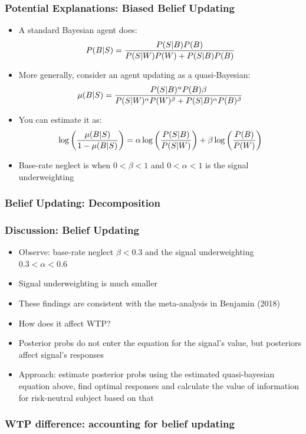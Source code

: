 \documentclass[11pt,hyperref={bookmarks=false}]{beamer}
\begin{document}
\begin{frame}
\frametitle{Potential Explanations: Biased Belief Updating}
\begin{itemize}
\item A standard Bayesian agent does:
$$P(B|S)={P(S|B)P(B)\over P(S|W)P(W)+P(S|B)P(B)}$$
\item More generally, consider an agent updating as a quasi-Bayesian:
$$\mu(B|S)={P(S|B)^{\alpha}P(B){\beta}\over P(S|W)^{\alpha} P(W)^{\beta}+P(S|B)^{\alpha}P(B)^{\beta}} $$
\item You can estimate it as:
$$\log\left({\mu(B|S) \over 1-\mu(B|S)}\right)=\alpha \log\left({P(S|B) \over P(S|W)}\right)+\beta \log \left({P(B)\over P(W)}\right)$$
\item Base-rate neglect is when $0<\beta<1$ and $0<\alpha<1$ is the signal underweighting
\end{itemize}
\end{frame}

\begin{frame}
\frametitle{Belief Updating: Decomposition}
\footnotesize

\end{frame}

\begin{frame}
\frametitle{Discussion: Belief Updating}
\begin{itemize}
\item Observe: base-rate neglect $\beta<0.3$ and the signal underweighting $0.3<\alpha<0.6$
\item Signal underweighting is much smaller
\item These findings are consistent with the meta-analysis in Benjamin (2018)
\item How does it affect WTP? 
\item Posterior probs do not enter the equation for the signal's value, but posteriors affect signal's responses
\item Approach: estimate posterior probs using the estimated quasi-bayesian equation above, find optimal responses and calculate the value of information for risk-neutral subject based on that
\end{itemize}
\end{frame}

\begin{frame}
\frametitle{WTP difference: accounting for belief updating}
\footnotesize


\end{frame}
\end{document}
